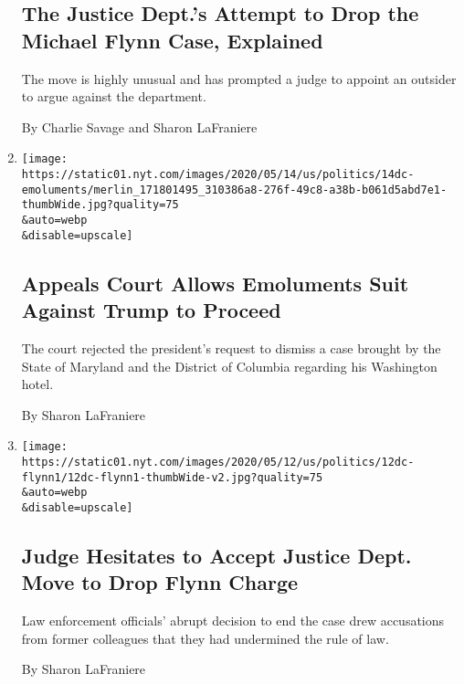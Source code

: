\begin{enumerate}
  \hypertarget{the-justice-depts-attempt-to-drop-the-michael-flynn-case-explained}{%
  \subsection{The Justice Dept.'s Attempt to Drop the Michael Flynn
  Case,
  Explained}\label{the-justice-depts-attempt-to-drop-the-michael-flynn-case-explained}}

  The move is highly unusual and has prompted a judge to appoint an
  outsider to argue against the department.

  By Charlie Savage and Sharon LaFraniere
\item
  \href{/2020/05/14/us/politics/trump-emoluments-clause-fourth-circuit.html}{}

  \texttt{[image: https://static01.nyt.com/images/2020/05/14/us/politics/14dc-emoluments/merlin\_171801495\_310386a8-276f-49c8-a38b-b061d5abd7e1-thumbWide.jpg?quality=75\\\&auto=webp\\\&disable=upscale]}

  \hypertarget{appeals-court-allows-emoluments-suit-against-trump-to-proceed}{%
  \subsection{Appeals Court Allows Emoluments Suit Against Trump to
  Proceed}\label{appeals-court-allows-emoluments-suit-against-trump-to-proceed}}

  The court rejected the president's request to dismiss a case brought
  by the State of Maryland and the District of Columbia regarding his
  Washington hotel.

  By Sharon LaFraniere
\item
  \href{/2020/05/12/us/politics/michael-flynn-charge-judge.html}{}

  \texttt{[image: https://static01.nyt.com/images/2020/05/12/us/politics/12dc-flynn1/12dc-flynn1-thumbWide-v2.jpg?quality=75\\\&auto=webp\\\&disable=upscale]}

  \hypertarget{judge-hesitates-to-accept-justice-dept-move-to-drop-flynn-charge}{%
  \subsection{Judge Hesitates to Accept Justice Dept. Move to Drop Flynn
  Charge}\label{judge-hesitates-to-accept-justice-dept-move-to-drop-flynn-charge}}

  Law enforcement officials' abrupt decision to end the case drew
  accusations from former colleagues that they had undermined the rule
  of law.

  By Sharon LaFraniere
\end{enumerate}

